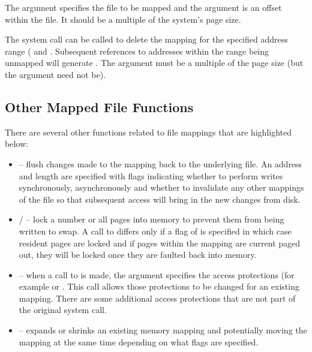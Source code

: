 \noindent
The  argument specifies the file to be mapped and the  argument is an offset within the file. It should be a multiple of the system's page size.

The  system call can be called to delete the mapping for the specified address range ( and . Subsequent references to addresses within the range being unmapped will generate .  The   argument must be a multiple of the page size (but the  argument need not  be).   


\subsection{Other Mapped File Functions}

There are several other functions related to file mappings that are highlighted below:

\begin{itemize}
	\item {} -- flush changes made to the mapping back to the underlying file. An address and length are specified
		with flags indicating whether to perform writes synchronously, asynchronously and whether to invalidate any other  	
		mappings of the file so that subsequent access will bring in the new changes from disk.
	\item {} /   -- lock a number or all pages into memory to prevent them from
		being written to swap. A call to  differs only if a flag of  is specified in
		which case resident pages are locked and if pages within the mapping are current paged out, they will be 
		locked once they are faulted back into memory.
	\item {} -- when a call to  is made, the  argument specifies the access protections
		(for example  or . This call allows those protections to be changed for an
		existing mapping. There are some additional access protections that are not part of the original 
		system call.
	\item {} -- expands or shrinks an existing memory mapping and potentially moving the mapping at the same time
		depending on what flags are specified.
\end{itemize}
       
